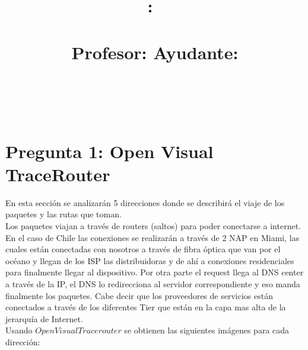 \documentclass{article}
\title{
\textmd{\textbf{\tareaRamo:\ \tareaTitulo}}\\
\normalsize\vspace{0.1in}\small{\tareaFecha}\\
\vspace{0.1in}\large{Profesor: \textit{\tareaProfesor} \qquad \qquad Ayudante: \textit{\tareaAyudante}}
}
\author{
    \textbf{\tareaAlumnoUno} \\
    \small{\tareaRolUno}
    \and
    \textbf{\tareaAlumnoDos} \\
    \small{\tareaRolDos}}
\date{}
\begin{document}
\maketitle

\section{Pregunta 1: Open Visual TraceRouter}	

En esta secci\'on se analizar\'an 5 direcciones donde se describir\'a el viaje de los paquetes y las rutas que toman.\\

Los paquetes viajan a trav\'es de routers (saltos) para poder conectarse a internet. En el caso de Chile las conexiones se realizar\'an a trav\'es de 2 NAP en Miami, las cuales est\'an conectadas con nosotros a trav\'es de fibra \'optica que van por el oc\'eano y llegan de los ISP las distribuidoras y de ah\'i a conexiones residenciales para finalmente llegar al dispositivo. Por otra parte el request llega al DNS center a trav\'es de la IP, el DNS lo redirecciona al servidor correspondiente y eso manda finalmente los paquetes. Cabe decir que los proveedores de servicios est\'an conectados a trav\'es de los diferentes Tier que est\'an en la capa mas alta de la jerarqu\'ia de Internet.\\

Usando $Open Visual Tracerouter$ se obtienen las siguientes im\'agenes para cada direcci\'on:
\end{document}
